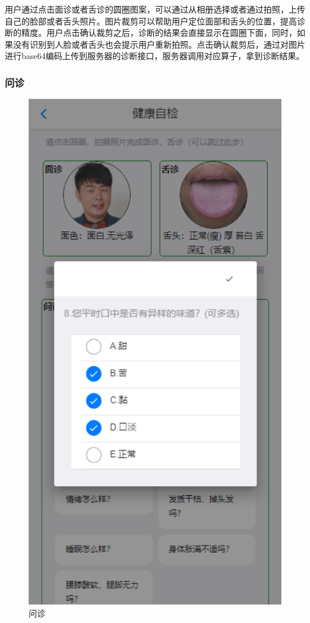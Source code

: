用户通过点击面诊或者舌诊的圆圈图案，可以通过从相册选择或者通过拍照，上传自己的脸部或者舌头照片。图片裁剪可以帮助用户定位面部和舌头的位置，提高诊断的精度。用户点击确认裁剪之后，诊断的结果会直接显示在圆圈下面，同时，如果没有识别到人脸或者舌头也会提示用户重新拍照。点击确认裁剪后，通过对图片进行base64编码上传到服务器的诊断接口，服务器调用对应算子，拿到诊断结果。

\subsubsection{问诊}

\begin{figure}[h]
    \centering
    \includegraphics{images/questions.png}
    \caption{问诊}
    \label{fig:questions}
\end{figure}
